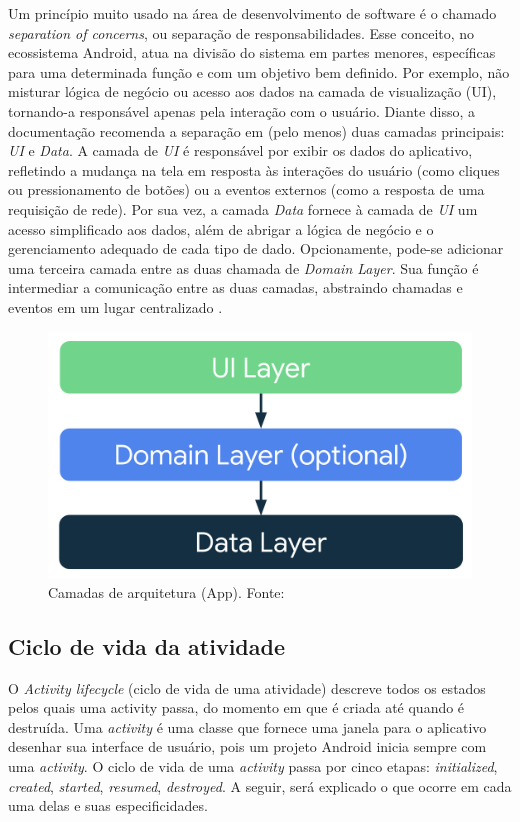 Um princípio muito usado na área de desenvolvimento de software é o chamado \textit{separation of concerns}, ou separação de responsabilidades. Esse conceito, no ecossistema Android,
atua na divisão do sistema em partes menores, específicas para uma determinada função e com um objetivo bem definido. Por exemplo, não misturar lógica de 
negócio ou acesso aos dados na camada de visualização (UI), tornando-a  responsável apenas pela interação com o usuário. Diante disso, a documentação recomenda a separação em (pelo menos)
duas camadas principais: \textit{UI} e \textit{Data}. A camada de \textit{UI} é responsável por exibir os dados do aplicativo, refletindo a mudança na tela em resposta às
interações do usuário (como cliques ou pressionamento de botões) ou a eventos externos (como a resposta de uma requisição de rede). Por sua vez, a camada \textit{Data} fornece à camada de \textit{UI} 
um acesso simplificado aos dados, além de abrigar a lógica de negócio e o gerenciamento adequado de cada tipo de dado. Opcionamente, pode-se adicionar uma terceira camada entre as duas chamada de \textit{Domain Layer}.
Sua função é intermediar a comunicação entre as duas camadas, abstraindo chamadas e eventos em um lugar centralizado \cite{google-developers-guideline}.

\begin{figure}[ht]
    \centering
    \includegraphics[width=.73\textwidth]{img/app-android-layers.png}
    \caption{Camadas de arquitetura (App). Fonte:\cite{google-developers-guideline}}\label{figAppLayer}
\end{figure}

\subsection{Ciclo de vida da atividade}

O \textit{Activity lifecycle} (ciclo de vida de uma atividade) descreve todos os estados pelos quais uma activity passa, do momento em que é criada
até quando é destruída. Uma \textit{activity} é uma classe que fornece uma janela para o aplicativo desenhar sua interface de usuário, pois um projeto Android 
inicia sempre com uma \textit{activity}. O ciclo de vida de uma \textit{activity} passa por cinco etapas: 
\textit{initialized}, \textit{created}, \textit{started}, \textit{resumed}, \textit{destroyed}. A seguir, será explicado o que ocorre em cada 
uma delas e suas especificidades.

